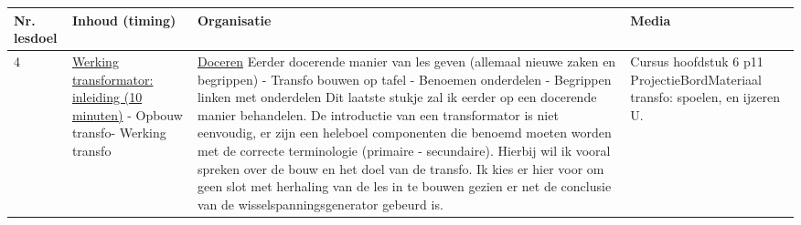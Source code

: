 \begin{landscape}
\begin{tabularx}{1.56\textwidth}{|p{1.5cm}|p{8cm}|X|p{4cm}|}
	\hline
	\textbf{Nr. lesdoel } & \textbf{Inhoud (timing)}  & \textbf{Organisatie } & \textbf{Media } \\ \hline
	4& \underline{Werking transformator:} \underline{inleiding (10 minuten)}\newline
	- Opbouw transfo\newline - Werking transfo
	&  \underline{Doceren}\newline 
	Eerder docerende manier van les geven (allemaal nieuwe zaken en begrippen) \newline
	- Transfo bouwen op tafel\newline
	- Benoemen onderdelen\newline
	- Begrippen linken met onderdelen
	Dit laatste stukje zal ik eerder op een docerende manier behandelen. De introductie van een transformator is niet eenvoudig, er zijn een heleboel componenten die benoemd moeten worden met de correcte terminologie (primaire - secundaire). Hierbij wil ik vooral spreken over de bouw en het doel van de transfo. Ik kies er hier voor om geen slot met herhaling van de les in te bouwen gezien er net de conclusie van de wisselspanningsgenerator gebeurd is. 	
	&  Cursus hoofdstuk 6 p11 \newline\newline Projectie\newline\newline Bord\newline\newline Materiaal transfo: spoelen, en ijzeren U.
	\\ \hline
\end{tabularx}\vspace{5mm}




	
\end{landscape}



